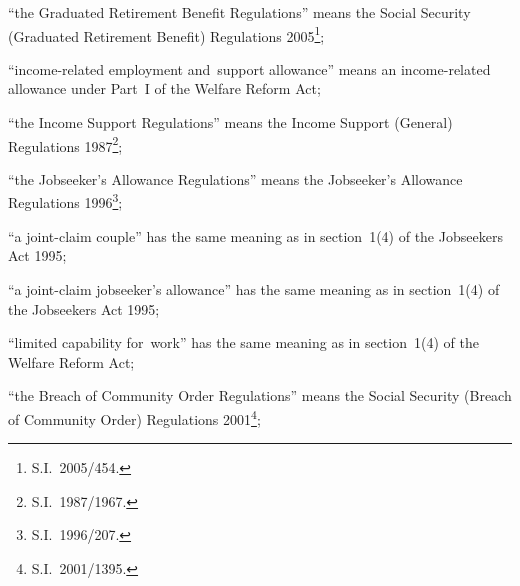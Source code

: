 \documentclass[12pt,a4paper]{article}
\begin{document}
\begin{enumerate}

“the Graduated Retirement Benefit Regulations” means the Social Security (Graduated Retirement Benefit) Regulations 2005\footnote{S.I.~2005/454.};

“income-related employment and~support allowance” means an income-related allowance under Part~I of the Welfare Reform Act;

“the Income Support Regulations” means the Income Support (General) Regulations 1987\footnote{\frenchspacing S.I.~1987/1967.};

“the Jobseeker’s Allowance Regulations” means the Jobseeker’s Allowance Regulations 1996\footnote{\frenchspacing S.I.~1996/207.};

“a joint-claim couple” has the same meaning as in section~1(4) of the Jobseekers Act 1995;

    “a joint-claim jobseeker’s allowance” has the same meaning as in section~1(4) of the Jobseekers Act 1995;


“limited capability for~work” has the same meaning as in section~1(4) of the Welfare Reform Act;

“the Breach of Community Order Regulations” means the Social Security (Breach of Community Order) Regulations 2001\footnote{S.I.~2001/1395.};



\end{enumerate}
\end{document}
